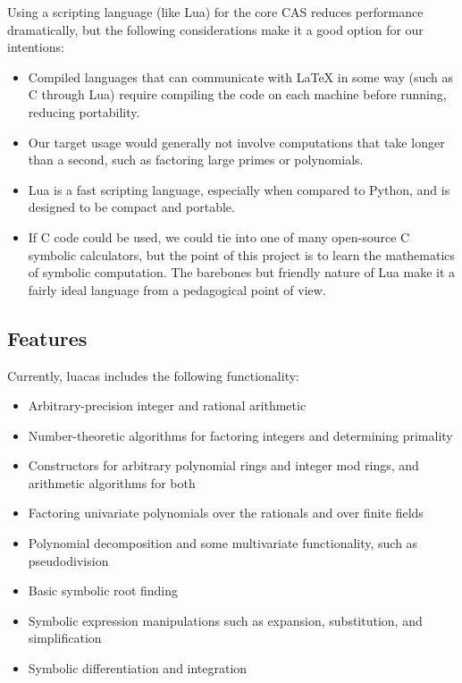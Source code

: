 \documentclass{article}
\begin{document}
Using a scripting language (like Lua) for the core CAS reduces performance dramatically, but the following considerations make it a good option for our intentions: 
                
\begin{itemize}
    \item Compiled languages that can communicate with \LaTeX{} in some way (such as C through Lua) require compiling the code on each machine before running, reducing portability.
    \item Our target usage would generally not involve computations that take longer than a second, such as factoring large primes or polynomials.
    \item Lua is a fast scripting language, especially when compared to Python, and is designed to be compact and portable.
    \item If C code could be used, we could tie into one of many open-source C symbolic calculators, but the point of this project is to learn the mathematics of symbolic computation. The barebones but friendly nature of Lua make it a fairly ideal language from a pedagogical point of view.
\end{itemize}

\subsection{Features}
                
Currently, {\ttfamily luacas} includes the following functionality:
                
\begin{itemize}
    \item Arbitrary-precision integer and rational arithmetic
    \item Number-theoretic algorithms for factoring integers and determining primality
    \item Constructors for arbitrary polynomial rings and integer mod rings, and arithmetic algorithms for both
    \item Factoring univariate polynomials over the rationals and over finite fields
    \item Polynomial decomposition and some multivariate functionality, such as pseudodivision
    \item Basic symbolic root finding
    \item Symbolic expression manipulations such as expansion, substitution, and simplification
    \item Symbolic differentiation and integration
\end{itemize}
                
\end{document}
